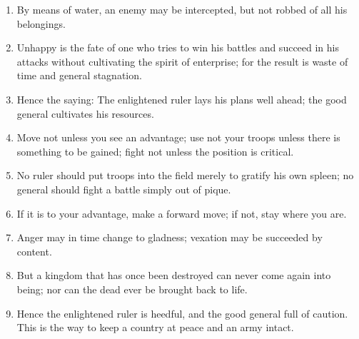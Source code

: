 \documentclass[oneside]{book}
\begin{document}
\begin{enumerate}
	\item By means of water, an enemy may be intercepted, but not robbed of all his belongings.
	\item Unhappy is the fate of one who tries to win his battles and succeed in his attacks without cultivating the spirit of enterprise; for the result is waste of time and general stagnation.
	\item Hence the saying: The enlightened ruler lays his plans well ahead; the good general cultivates his resources.
	\item Move not unless you see an advantage; use not your troops unless there is something to be gained; fight not unless the position is critical.
	\item No ruler should put troops into the field merely to gratify his own spleen; no general should fight a battle simply out of pique.
	\item If it is to your advantage, make a forward move; if not, stay where you are.
	\item Anger may in time change to gladness; vexation may be succeeded by content.
	\item But a kingdom that has once been destroyed can never come again into being; nor can the dead ever be brought back to life.
	\item Hence the enlightened ruler is heedful, and the good general full of caution. This is the way to keep a country at peace and an army intact.
\end{enumerate}
\end{document}
